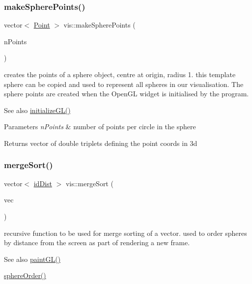 \subsubsection{\texorpdfstring{make\+Sphere\+Points()}{makeSpherePoints()}}
{\footnotesize\ttfamily vector$<$ \mbox{\hyperlink{struct_point}{Point}} $>$ vis\+::make\+Sphere\+Points (\begin{DoxyParamCaption}\item[{int}]{n\+Points }\end{DoxyParamCaption})}

creates the points of a sphere object, centre at origin, radius 1. this template sphere can be copied and used to represent all spheres in our visualisation. The sphere points are created when the Open\+GL widget is initialised by the program.

\begin{DoxySeeAlso}{See also}
\mbox{\hyperlink{classvis_aacc3b133f9fae3b66e1e13bfe789f314}{initialize\+G\+L()}} 
\end{DoxySeeAlso}

\begin{DoxyParams}{Parameters}
{\em n\+Points} & number of points per circle in the sphere \\
\hline
\end{DoxyParams}
\begin{DoxyReturn}{Returns}
vector of double triplets defining the point coords in 3d 
\end{DoxyReturn}
\mbox{\label{classvis_a6da50dd6a74fcba4055c2032b457c829}} 
\subsubsection{\texorpdfstring{merge\+Sort()}{mergeSort()}}
{\footnotesize\ttfamily vector$<$ \mbox{\hyperlink{structid_dist}{id\+Dist}} $>$ vis\+::merge\+Sort (\begin{DoxyParamCaption}\item[{vector$<$ \mbox{\hyperlink{structid_dist}{id\+Dist}} $>$}]{vec }\end{DoxyParamCaption})}

recursive function to be used for merge sorting of a vector. used to order spheres by distance from the screen as part of rendering a new frame.

\begin{DoxySeeAlso}{See also}
\mbox{\hyperlink{classvis_ace835462bb98cad495e829c08e1a26ea}{paint\+G\+L()}} 

\mbox{\hyperlink{classvis_a250353e36f42fd058d6b59692356d29a}{sphere\+Order()}} 
\end{DoxySeeAlso}

